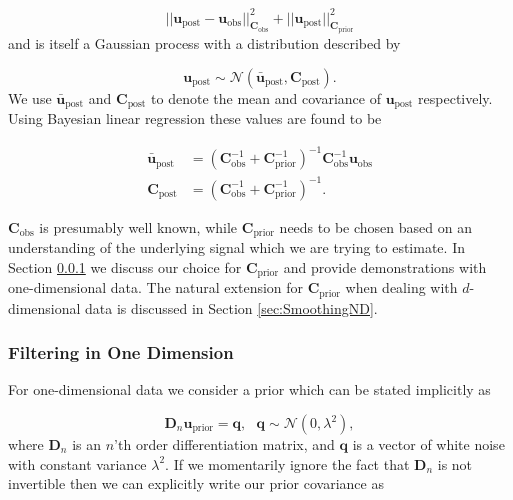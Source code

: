 \documentclass[10pt,a4paper]{article}
\begin{document}
\begin{equation}\label{eq:Objective}
||\mathbf{u}_\mathrm{post} - \mathbf{u}_\mathrm{obs}||_{\mathbf{C}_\mathrm{obs}}^2 + 
||\mathbf{u}_\mathrm{post}||_{\mathbf{C}_\mathrm{prior}}^2
\end{equation}
and is itself a Gaussian process with a distribution described by

\begin{equation}
  \mathbf{u}_\mathrm{post} \sim \mathcal{N}(\mathbf{\bar{u}}_\mathrm{post},\mathbf{C}_\mathrm{post}).
\end{equation}
We use $\mathbf{\bar{u}}_\mathrm{post}$ and $\mathbf{C}_\mathrm{post}$ to denote the mean and covariance of $\mathbf{u}_\mathrm{post}$ respectively.  Using Bayesian linear regression \citep{Tarantola2005} these values are found to be  

\begin{equation}\label{eq:GeneralSolution}
\begin{split}
  \mathbf{\bar{u}}_\mathrm{post} &= (\mathbf{C}_\mathrm{obs}^{-1} + 
                            \mathbf{C}_\mathrm{prior}^{-1})^{-1}
                            \mathbf{C}_\mathrm{obs}^{-1} \mathbf{u}_\mathrm{obs}
\\
\mathbf{C}_\mathrm{post} &= (\mathbf{C}_\mathrm{obs}^{-1} + 
                             \mathbf{C}_\mathrm{prior}^{-1})^{-1}.                          
\end{split}
\end{equation}
 
$\mathbf{C}_\mathrm{obs}$ is presumably well known, while $\mathbf{C}_\mathrm{prior}$ needs to be chosen based on an understanding of the underlying signal which we are trying to estimate. In Section \ref{sec:Smoothing1D} we discuss our choice for $\mathbf{C}_\mathrm{prior}$ and provide demonstrations with one-dimensional data.  The natural extension for $\mathbf{C}_\mathrm{prior}$ when dealing with $d$-dimensional data is discussed in Section \ref{sec:SmoothingND}.  

\subsubsection{Filtering in One Dimension}\label{sec:Smoothing1D}
For one-dimensional data we consider a prior which can be stated implicitly as

\begin{equation}\label{eq:ImplicitPrior1D}
  \mathbf{D}_{n} \mathbf{u}_\mathrm{prior} = \mathbf{q}, \ \ \ \mathbf{q} \sim \mathcal{N}(0,\lambda^2),
\end{equation}  
where $\mathbf{D}_n$ is an $n$'th order differentiation matrix, and $\mathbf{q}$ is a vector of white noise with constant variance $\lambda^2$.  If we momentarily ignore the fact that $\mathbf{D}_n$ is not invertible then we can explicitly write our prior covariance as
\end{document}
